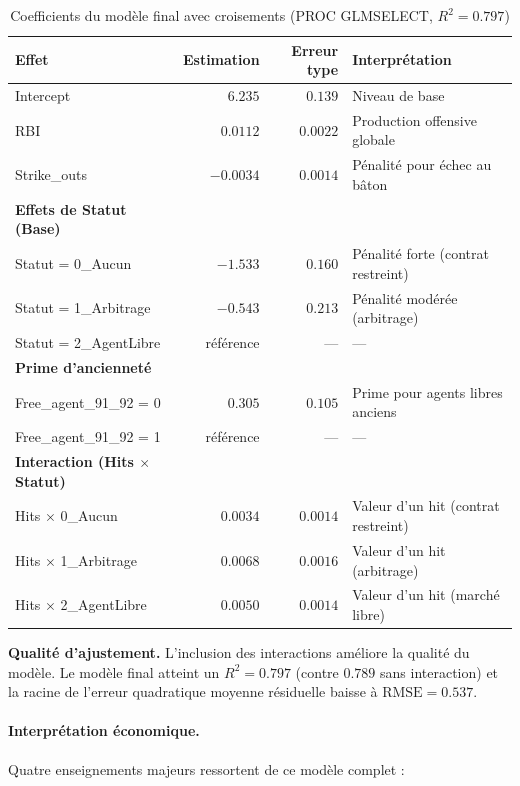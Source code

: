 \documentclass[11pt,a4paper]{article}
\begin{document}
\begin{table}[H]
\centering
\caption{Coefficients du modèle final avec croisements (PROC GLMSELECT, $R^2 = 0.797$)}
\label{tab:reg_mult}
\small
\begin{tabular}{lrrl}
\toprule
\textbf{Effet} & \textbf{Estimation} & \textbf{Erreur type} & \textbf{Interprétation} \\
\midrule
Intercept                      & $6.235$ & $0.139$ & Niveau de base \\
RBI                            & $0.0112$ & $0.0022$ & Production offensive globale \\
Strike\_outs                   & $-0.0034$ & $0.0014$ & Pénalité pour échec au bâton \\
\midrule
\textbf{Effets de Statut (Base)} & & & \\
Statut = 0\_Aucun              & $-1.533$ & $0.160$ & Pénalité forte (contrat restreint) \\
Statut = 1\_Arbitrage          & $-0.543$ & $0.213$ & Pénalité modérée (arbitrage) \\
Statut = 2\_AgentLibre         & référence & --- & --- \\
\midrule
\textbf{Prime d'ancienneté} & & & \\
Free\_agent\_91\_92 = 0        & $0.305$ & $0.105$ & Prime pour agents libres anciens \\
Free\_agent\_91\_92 = 1        & référence & --- & --- \\
\midrule
\textbf{Interaction (Hits $\times$ Statut)} & & & \\
Hits $\times$ 0\_Aucun         & $0.0034$ & $0.0014$ & Valeur d'un hit (contrat restreint) \\
Hits $\times$ 1\_Arbitrage     & $0.0068$ & $0.0016$ & Valeur d'un hit (arbitrage) \\
Hits $\times$ 2\_AgentLibre    & $0.0050$ & $0.0014$ & Valeur d'un hit (marché libre) \\
\bottomrule
\end{tabular}
\end{table}

\noindent\textbf{Qualité d'ajustement.}
L'inclusion des interactions améliore la qualité du modèle. Le modèle final atteint un $R^2 = 0.797$ (contre $0.789$ sans interaction) et la racine de l'erreur quadratique moyenne résiduelle baisse à $\text{RMSE} = 0.537$.

\paragraph{Interprétation économique.}
Quatre enseignements majeurs ressortent de ce modèle complet :
\end{document}
